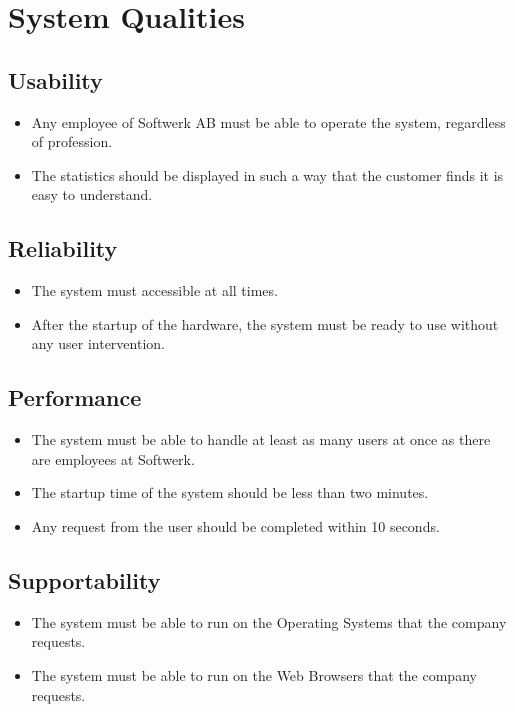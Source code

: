 \section{System Qualities}

\subsection{Usability}

\begin{itemize}
\item Any employee of Softwerk AB must be able to operate the system, regardless of profession.
\item The statistics should be displayed in such a way that the customer finds it is easy to understand.
\end{itemize}

\subsection{Reliability}

\begin{itemize}
\item The system must accessible at all times.
\item After the startup of the hardware, the system must be ready to use without any user intervention.
\end{itemize}

\subsection{Performance}

\begin{itemize}
\item The system must be able to handle at least as many users at once as there are employees at Softwerk.
\item The startup time of the system should be less than two minutes.
\item Any request from the user should be completed within 10 seconds.
\end{itemize}

\subsection{Supportability}

\begin{itemize}
\item The system must be able to run on the Operating Systems that the company requests.
\item The system must be able to run on the Web Browsers that the company requests.
\end{itemize}



